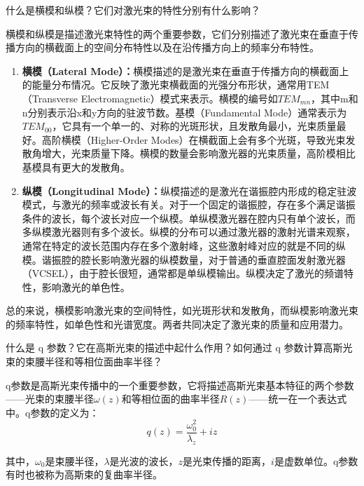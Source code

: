 \documentclass[dvipsnames, svgnames,a4paper,11pt]{article}
\begin{document}
	




\begin{question}
	什么是横模和纵模？它们对激光束的特性分别有什么影响？
\end{question}

	横模和纵模是描述激光束特性的两个重要参数，它们分别描述了激光束在垂直于传播方向的横截面上的空间分布特性以及在沿传播方向上的频率分布特性。

	\begin{enumerate}
		\item \textbf{横模（Lateral Mode）：}横模描述的是激光束在垂直于传播方向的横截面上的能量分布情况。它反映了激光束横截面的光强分布形状，通常用TEM（Transverse Electromagnetic）模式来表示。横模的编号如$TEM_{mn}$，其中m和n分别表示沿x和y方向的驻波节数。基模（Fundamental Mode）通常表示为$TEM_{00}$，它具有一个单一的、对称的光斑形状，且发散角最小，光束质量最好。高阶横模（Higher-Order Modes）在横截面上会有多个光斑，导致光束发散角增大，光束质量下降。横模的数量会影响激光器的光束质量，高阶模相比基模具有更大的发散角。
		
		\item \textbf{纵模（Longitudinal Mode）：}纵模描述的是激光在谐振腔内形成的稳定驻波模式，与激光的频率或波长有关。对于一个固定的谐振腔，存在多个满足谐振条件的波长，每个波长对应一个纵模。单纵模激光器在腔内只有单个波长，而多纵模激光器则有多个波长。纵模的分布可以通过激光器的激射光谱来观察，通常在特定的波长范围内存在多个激射峰，这些激射峰对应的就是不同的纵模。谐振腔的腔长影响激光器的纵模数量，对于普通的垂直腔面发射激光器（VCSEL），由于腔长很短，通常都是单纵模输出。纵模决定了激光的频谱特性，影响激光的单色性。
	\end{enumerate}
	
	总的来说，横模影响激光束的空间特性，如光斑形状和发散角，而纵模影响激光束的频率特性，如单色性和光谱宽度。两者共同决定了激光束的质量和应用潜力。
	





\begin{question}
	什么是 q 参数？它在高斯光束的描述中起什么作用？如何通过 q 参数计算高斯光束的束腰半径和等相位面曲率半径？
\end{question}

	q参数是高斯光束传播中的一个重要参数，它将描述高斯光束基本特征的两个参数——光束的束腰半径$\omega(z)$和等相位面的曲率半径$R(z)$——统一在一个表达式中。q参数的定义为：
	\[
		q(z) = \frac{\omega_0^2}{\lambda_z} + i z
	\]
	
	其中，$\omega_0$是束腰半径，$\lambda$是光波的波长，$z$是光束传播的距离，$i$是虚数单位。q参数有时也被称为高斯束的复曲率半径。
\end{document}
